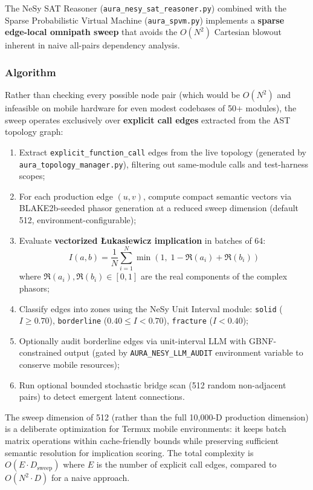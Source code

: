 \documentclass[11pt]{article}
\begin{document}
The NeSy SAT Reasoner (\texttt{aura\_nesy\_sat\_reasoner.py}) combined with the Sparse Probabilistic Virtual Machine (\texttt{aura\_spvm.py}) implements a \textbf{sparse edge-local omnipath sweep} that avoids the $O(N^2)$ Cartesian blowout inherent in naive all-pairs dependency analysis.

\subsubsection{Algorithm}

Rather than checking every possible node pair (which would be $O(N^2)$ and infeasible on mobile hardware for even modest codebases of 50+ modules), the sweep operates exclusively over \textbf{explicit call edges} extracted from the AST topology graph:

\begin{enumerate}[label=(\roman*)]
    \item Extract \texttt{explicit\_function\_call} edges from the live topology (generated by \texttt{aura\_topology\_manager.py}), filtering out same-module calls and test-harness scopes;
    \item For each production edge $(u, v)$, compute compact semantic vectors via BLAKE2b-seeded phasor generation at a reduced sweep dimension (default 512, environment-configurable);
    \item Evaluate \textbf{vectorized Łukasiewicz implication} in batches of 64:
    \begin{equation}
    I(a, b) = \frac{1}{N}\sum_{i=1}^{N} \min\left(1,\; 1 - \Re(a_i) + \Re(b_i)\right)
    \end{equation}
    where $\Re(a_i), \Re(b_i) \in [0, 1]$ are the real components of the complex phasors;
    \item Classify edges into zones using the NeSy Unit Interval module: \texttt{solid} ($I \geq 0.70$), \texttt{borderline} ($0.40 \leq I < 0.70$), \texttt{fracture} ($I < 0.40$);
    \item Optionally audit borderline edges via unit-interval LLM with GBNF-constrained output (gated by \texttt{AURA\_NESY\_LLM\_AUDIT} environment variable to conserve mobile resources);
    \item Run optional bounded stochastic bridge scan (512 random non-adjacent pairs) to detect emergent latent connections.
\end{enumerate}

The sweep dimension of 512 (rather than the full 10,000-D production dimension) is a deliberate optimization for Termux mobile environments: it keeps batch matrix operations within cache-friendly bounds while preserving sufficient semantic resolution for implication scoring. The total complexity is $O(E \cdot D_{\text{sweep}})$ where $E$ is the number of explicit call edges, compared to $O(N^2 \cdot D)$ for a naive approach.
\end{document}

